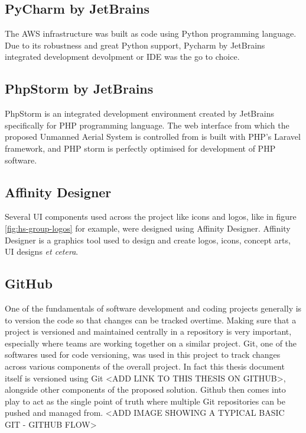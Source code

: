 \subsection{PyCharm by JetBrains}
\label{subsec:pycharm}
The AWS infrastructure was built as code using Python programming language. Due to its robustness and great Python support, Pycharm by JetBrains integrated development devolpment or IDE was the go to choice.

\subsection{PhpStorm by JetBrains}
\label{subsec:phpstorm}
PhpStorm is an integrated development environment created by JetBrains specifically for PHP programming language. The web interface from which the proposed Unmanned Aerial System is controlled from is built with PHP's Laravel framework, and PHP storm is perfectly optimised for development of PHP software.

\subsection{Affinity Designer}
\label{subsec:affinity-designer}
Several UI components used across the project like icons and logos, like in figure \ref{fig:hs-group-logos} for example, were designed using Affinity Designer. Affinity Designer is a graphics tool used to design and create logos, icons, concept arts, UI designs \textit{et cetera}.

\subsection{GitHub}
\label{subsec:github}
One of the fundamentals of software development and coding projects generally is to version the code so that changes can be tracked overtime. Making sure that a project is versioned and maintained centrally in a repository is very important, especially where teams are working together on a similar project. Git, one of the softwares used for code versioning, was used in this project to track changes across various components of the overall project. In fact this thesis document itself is versioned using Git <ADD LINK TO THIS THESIS ON GITHUB>, alongside other components of the proposed solution. Github then comes into play to act as the single point of truth where multiple Git repositories can be pushed and managed from.
<ADD IMAGE SHOWING A TYPICAL BASIC GIT - GITHUB FLOW>

